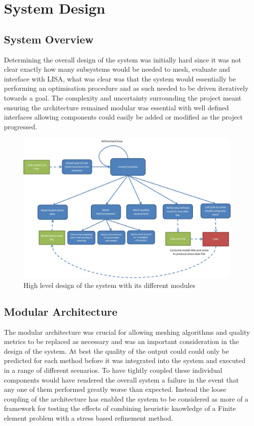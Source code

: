 \section{System Design}

\subsection{System Overview}
Determining the overall design of the system was initially hard since it was not clear exactly how many subsystems would be needed to mesh, evaluate and interface with LISA, what was clear was that the system would essentially be performing an optimisation procedure and as such needed to be driven iteratively towards a goal. The complexity and uncertainty surrounding the project meant ensuring the architecture remained modular was essential with well defined interfaces allowing components could easily be added or modified as the project progressed. \\ 

\begin{figure}[!h]
  \centerline{\includegraphics[width=150mm, scale=1]{../Graphics/SystemDesignDiagram.jpeg}}
  \caption{High level design of the system with its different modules}
  \label{fig:h-refinementImp}
\end{figure}


\subsection{Modular Architecture}
The modular architecture was crucial for allowing meshing algorithms and quality metrics to be replaced as necessary and was an important consideration in the design of the system. At best the quality of the output could could only be predicted for each method before it was integrated into the system and executed in a range of different scenarios. To have tightly coupled these individual components would have rendered the overall system a failure in the event that any one of them performed greatly worse than expected. Instead the loose coupling of the architecture has enabled the system to be considered as more of a framework for testing the effects of combining heuristic knowledge of a Finite element problem with a stress based refinement method.\\

